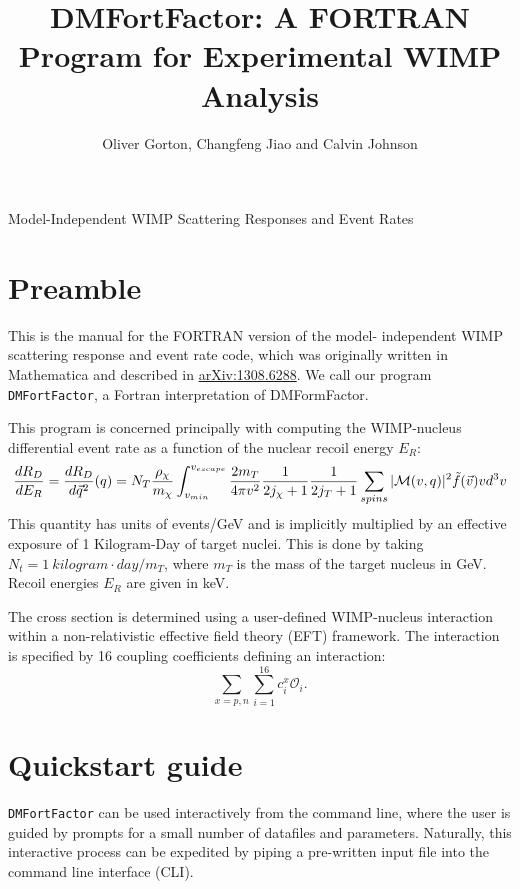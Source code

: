 \documentclass[
14pt, %
a4paper, %
oneside, %
headinclude,footinclude, %
BCOR5mm, %
]{scrartcl}
\title{DMFortFactor: A FORTRAN Program for Experimental WIMP Analysis}
\author{Oliver Gorton, Changfeng Jiao and Calvin Johnson}
\begin{document}
\selectfont
\setlength{\parindent}{0em}
\setlength{\parskip}{1em}

\maketitle

{

\centering

Model-Independent WIMP Scattering Responses and Event Rates

}

\tableofcontents


\clearpage

\section{Preamble}
This is the manual for the FORTRAN version of the model- independent WIMP 
scattering response and event rate code, which was originally written in 
Mathematica and described in 
\href{http://arxiv.org/abs/1308.6288v1}{arXiv:1308.6288}.  We call our program
{\tt DMFortFactor}, a Fortran interpretation of DMFormFactor.

This program is concerned principally with computing the WIMP-nucleus differential 
event rate as a function of the nuclear recoil energy $E_R$:
\begin{dmath}
\frac{dR_D}{dE_R} = \frac{dR_D}{d\vec{q}^2}(q)
	\\= N_T\frac{\rho_\chi}{m_\chi}\int_{v_{min}}^{v_{escape}} 
	\frac{2m_T}{4\pi v^2}\frac{1}{2j_\chi+1}\frac{1}{2j_T+1}
	\sum_{spins}|\mathcal{M}(v,q)|^2  \tilde{f}(\vec{v})vd^3v
\end{dmath}
This quantity has units of events/GeV and is implicitly multiplied by
an effective exposure of 1 Kilogram-Day of target nuclei. This is done by
taking $N_t = 1\ kilogram\cdot day / m_T$, where $m_T$ is the mass of the target
nucleus in GeV. Recoil energies $E_R$ are given in keV.

The cross section is determined using a user-defined WIMP-nucleus interaction
within a non-relativistic effective field theory (EFT) framework. The
interaction is specified by 16 coupling coefficients defining an interaction:
\begin{equation}
	\sum_{x=p,n}\sum_{i=1}^{16} c_i^x \mathcal{O}_i.
\end{equation}

\section{Quickstart guide}
{\tt DMFortFactor} can be used interactively from the command line,  where the
user is guided by prompts for a small number of datafiles and parameters.
Naturally, this interactive process can be expedited by piping a pre-written
input file into the command line interface (CLI).
\end{document}
